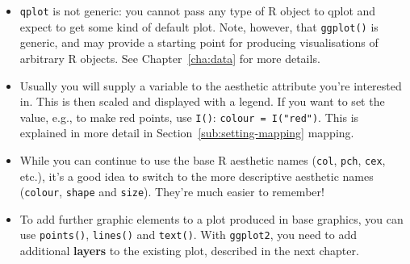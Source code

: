 \begin{itemize}
  \item {\tt qplot} is not generic: you cannot pass any type of R object to qplot and expect to get some kind of default plot.  Note, however, that {\tt ggplot()} is generic, and may provide a starting point for producing visualisations of arbitrary R objects.  See Chapter~\ref{cha:data} for more details.
  
  \item Usually you will supply a variable to the aesthetic attribute you're interested in.  This is then scaled and displayed with a legend.  If you want to set the value, e.g., to make red points, use {\tt I()}: {\tt colour = I("red")}.  This is explained in more detail in Section~\ref{sub:setting-mapping} mapping.
  
  \item While you can continue to use the base R aesthetic names ({\tt col},  {\tt pch}, {\tt cex}, etc.), it's a good idea to switch to the more descriptive \ggplot aesthetic names ({\tt colour}, {\tt shape} and {\tt size}).  They're much easier to remember!

  \item To add further graphic elements to a plot produced in base graphics, you can use {\tt points()}, {\tt lines()} and {\tt text()}.  With {\tt ggplot2}, you need to add additional {\bf layers} to the existing plot, described in the next chapter.
  
\end{itemize}


